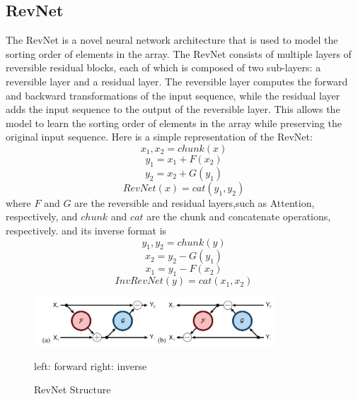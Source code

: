 \documentclass{article}
\begin{document}
\subsection{RevNet}
The RevNet is a novel neural network architecture that is used to model the sorting order of elements in the array. The RevNet consists of multiple layers of reversible residual blocks, each of which is composed of two sub-layers\cite{theefficienttransformer}: a reversible layer and a residual layer. The reversible layer computes the forward and backward transformations of the input sequence, while the residual layer adds the input sequence to the output of the reversible layer. This allows the model to learn the sorting order of elements in the array while preserving the original input sequence.
Here is a simple representation of the RevNet:
\begin{equation}
    x_1,x_2 = chunk(x)
\end{equation}
\begin{equation}
    y_1 = x_1 + F(x_2)
\end{equation}
\begin{equation}
    y_2 = x_2 + G(y_1)
\end{equation}
\begin{equation}
    RevNet(x) = cat(y_1, y_2)
\end{equation}
where $F$ and $G$ are the reversible and residual layers,such as Attention, respectively, and $chunk$ and $cat$ are the chunk and concatenate operations, respectively.
and its inverse format is
\begin{equation}
    y_1,y_2 = chunk(y)
\end{equation}
\begin{equation}
    x_2 = y_2 - G(y_1)
\end{equation}
\begin{equation}
    x_1 = y_1 - F(x_2)
\end{equation}
\begin{equation}
    InvRevNet(y) = cat(x_1,x_2)
\end{equation}

\begin{figure}
    \centering
    \includegraphics[width=0.8\textwidth]
    {picture/RevNet.png}


    {left: forward  right: inverse}
    \caption{RevNet Structure}
    \label{RevNet Structure}
\end{figure}
\end{document}
